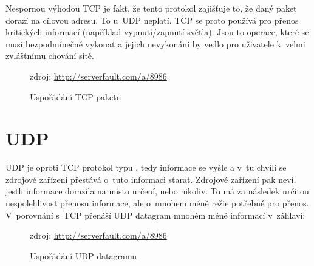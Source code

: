 Nespornou výhodou TCP je fakt, že tento protokol zajišťuje to, že daný paket dorazí na cílovou adresu. To u~UDP neplatí. TCP se proto používá pro přenos kritických informací (například vypnutí/zapnutí světla). Jsou to operace, které se musí bezpodmínečně vykonat a jejich nevykonání by vedlo pro uživatele k~velmi zvláštnímu chování sítě.

\begin{figure}[H]
    \centering
	\caption{Uspořádání TCP paketu}
	\small zdroj: \url{http://serverfault.com/a/8986}
	\label{fig:tcp-packet}
\end{figure}


\section{UDP}
UDP  je oproti TCP protokol typu , tedy informace se vyšle a v~tu chvíli se zdrojové zařízení přestává o~tuto informaci starat. Zdrojové zařízení pak neví, jestli informace dorazila na místo určení, nebo nikoliv. To má za následek určitou nespolehlivost přenosu informace, ale o~mnohem méně režie potřebné pro přenos. V~porovnání s~TCP přenáší UDP datagram mnohém méně informací v~záhlaví:

\begin{figure}[H]
    \centering
	\caption{Uspořádání UDP datagramu}
	\small zdroj: \url{http://serverfault.com/a/8986}
	\label{fig:udp-datagram}
\end{figure}

